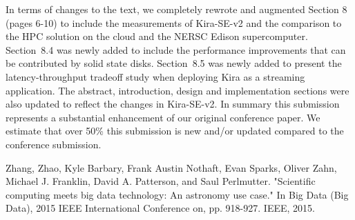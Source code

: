 \documentclass[10pt,a4paper]{article}
\begin{document}
In terms of changes to the text, we completely rewrote and augmented Section 8 (pages 6-10) to include the measurements of Kira-SE-v2 and the comparison
to the HPC solution on the cloud and the NERSC Edison supercomputer.
Section~8.4 was newly added to include the performance improvements that can be contributed by solid state disks.
Section~8.5 was newly added to present the latency-throughput tradeoff study when deploying Kira as a streaming application.
The abstract, introduction, design and implementation sections were also updated to reflect the changes in Kira-SE-v2.
In summary this submission represents a substantial enhancement of our original conference paper.   
We estimate that over 50\% this submission is new and/or updated compared to the conference submission.


\begin{thebibliography}{1}

Zhang, Zhao, Kyle Barbary, Frank Austin Nothaft, Evan Sparks, Oliver Zahn, Michael J. Franklin, David A. Patterson, and Saul Perlmutter. "Scientific computing meets big data technology: An astronomy use case." In Big Data (Big Data), 2015 IEEE International Conference on, pp. 918-927. IEEE, 2015.
\end{thebibliography}
\end{document}

